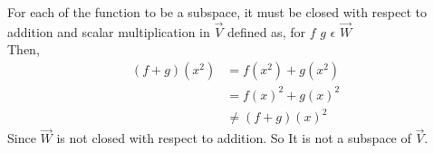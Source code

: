 For each of the function to be a subspace, it must be closed with respect to addition and scalar multiplication in $\vec{V}$ defined as, for $f$ $g$ $\epsilon$ $\vec{W}$\\
Then,
\begin{align}
(f+g)(x^2)&=f(x^2)+g(x^2)\\
&=f(x)^2+ g(x)^2\\
&\ne(f+g)(x)^2
\end{align}
Since $\vec{W}$ is not closed with respect to addition. So It is not a subspace of $\vec{V}$.
